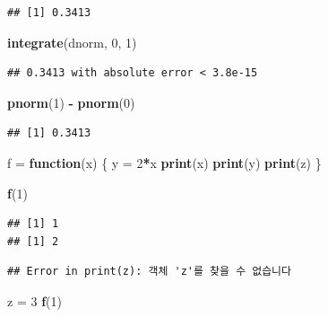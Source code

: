 \documentclass[11pt,]{krantz}
\makeatletter
\newenvironment{Shaded}{\begin{snugshade}}{\end{snugshade}}
\newcommand{\KeywordTok}[1]{\textcolor[rgb]{0.13,0.29,0.53}{\textbf{#1}}}
\newcommand{\DecValTok}[1]{\textcolor[rgb]{0.00,0.00,0.81}{#1}}
\newcommand{\StringTok}[1]{\textcolor[rgb]{0.31,0.60,0.02}{#1}}
\newcommand{\ControlFlowTok}[1]{\textcolor[rgb]{0.13,0.29,0.53}{\textbf{#1}}}
\newcommand{\OperatorTok}[1]{\textcolor[rgb]{0.81,0.36,0.00}{\textbf{#1}}}
\newcommand{\NormalTok}[1]{#1}
\newenvironment{kframe}{%
\medskip{}
\setlength{\fboxsep}{.8em}
 \def\at@end@of@kframe{}%
 \ifinner\ifhmode%
  \def\at@end@of@kframe{\end{minipage}}%
  \begin{minipage}{\columnwidth}%
 \fi\fi%
 \def\FrameCommand##1{\hskip\@totalleftmargin \hskip-\fboxsep
 \colorbox{shadecolor}{##1}\hskip-\fboxsep
     \hskip-\linewidth \hskip-\@totalleftmargin \hskip\columnwidth}%
 \MakeFramed {\advance\hsize-\width
   \@totalleftmargin\z@ \linewidth\hsize
   \@setminipage}}%
 {\par\unskip\endMakeFramed%
 \at@end@of@kframe}
\renewenvironment{Shaded}{\begin{kframe}}{\end{kframe}}
\theoremstyle{definition}
\theoremstyle{definition}
\theoremstyle{remark}
\makeatother
\begin{document}
\begin{verbatim}
## [1] 0.3413
\end{verbatim}

\begin{Shaded}
\begin{Highlighting}[]
\KeywordTok{integrate}\NormalTok{(dnorm, }\DecValTok{0}\NormalTok{, }\DecValTok{1}\NormalTok{)}
\end{Highlighting}
\end{Shaded}

\begin{verbatim}
## 0.3413 with absolute error < 3.8e-15
\end{verbatim}

\begin{Shaded}
\begin{Highlighting}[]
\KeywordTok{pnorm}\NormalTok{(}\DecValTok{1}\NormalTok{) }\OperatorTok{-}\StringTok{ }\KeywordTok{pnorm}\NormalTok{(}\DecValTok{0}\NormalTok{)}
\end{Highlighting}
\end{Shaded}

\begin{verbatim}
## [1] 0.3413
\end{verbatim}

\begin{Shaded}
\begin{Highlighting}[]
\NormalTok{f =}\StringTok{ }\ControlFlowTok{function}\NormalTok{(x) }
\NormalTok{\{}
\NormalTok{  y =}\StringTok{ }\DecValTok{2}\OperatorTok{*}\NormalTok{x}
  \KeywordTok{print}\NormalTok{(x)}
  \KeywordTok{print}\NormalTok{(y)}
  \KeywordTok{print}\NormalTok{(z)}
\NormalTok{\}}

\KeywordTok{f}\NormalTok{(}\DecValTok{1}\NormalTok{)}
\end{Highlighting}
\end{Shaded}

\begin{verbatim}
## [1] 1
## [1] 2
\end{verbatim}

\begin{verbatim}
## Error in print(z): 객체 'z'를 찾을 수 없습니다
\end{verbatim}

\begin{Shaded}
\begin{Highlighting}[]
\NormalTok{z =}\StringTok{ }\DecValTok{3}
\KeywordTok{f}\NormalTok{(}\DecValTok{1}\NormalTok{)}
\end{Highlighting}
\end{Shaded}
\end{document}
